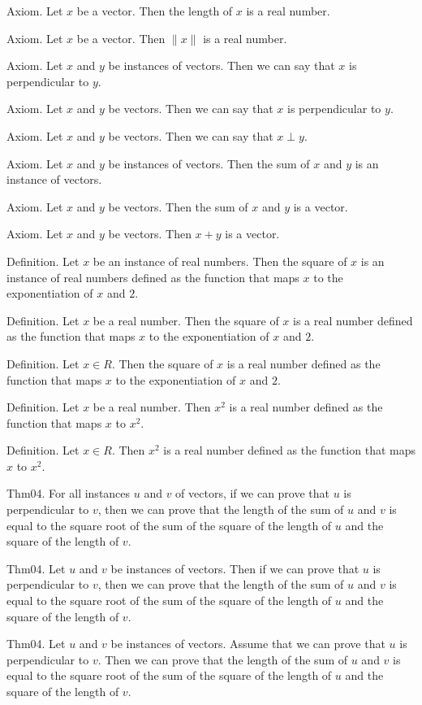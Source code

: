 \documentclass{article}
\begin{document}
Axiom. Let $x$ be a vector. Then the length of $x$ is a real number.

Axiom. Let $x$ be a vector. Then $\| x \|$ is a real number.

Axiom. Let $x$ and $y$ be instances of vectors. Then we can say that $x$ is perpendicular to $y$.

Axiom. Let $x$ and $y$ be vectors. Then we can say that $x$ is perpendicular to $y$.

Axiom. Let $x$ and $y$ be vectors. Then we can say that $x \perp y$.

Axiom. Let $x$ and $y$ be instances of vectors. Then the sum of $x$ and $y$ is an instance of vectors.

Axiom. Let $x$ and $y$ be vectors. Then the sum of $x$ and $y$ is a vector.

Axiom. Let $x$ and $y$ be vectors. Then $x + y$ is a vector.

Definition. Let $x$ be an instance of real numbers. Then the square of $x$ is an instance of real numbers defined as the function that maps $x$ to the exponentiation of $x$ and $2$.

Definition. Let $x$ be a real number. Then the square of $x$ is a real number defined as the function that maps $x$ to the exponentiation of $x$ and $2$.

Definition. Let $x \in R$. Then the square of $x$ is a real number defined as the function that maps $x$ to the exponentiation of $x$ and $2$.

Definition. Let $x$ be a real number. Then $x ^{ 2}$ is a real number defined as the function that maps $x$ to $x ^ {2}$.

Definition. Let $x \in R$. Then $x ^{ 2}$ is a real number defined as the function that maps $x$ to $x ^ {2}$.

Thm04. For all instances $u$ and $v$ of vectors, if we can prove that $u$ is perpendicular to $v$, then we can prove that the length of the sum of $u$ and $v$ is equal to the square root of the sum of the square of the length of $u$ and the square of the length of $v$.

Thm04. Let $u$ and $v$ be instances of vectors. Then if we can prove that $u$ is perpendicular to $v$, then we can prove that the length of the sum of $u$ and $v$ is equal to the square root of the sum of the square of the length of $u$ and the square of the length of $v$.

Thm04. Let $u$ and $v$ be instances of vectors. Assume that we can prove that $u$ is perpendicular to $v$. Then we can prove that the length of the sum of $u$ and $v$ is equal to the square root of the sum of the square of the length of $u$ and the square of the length of $v$.
\end{document}
